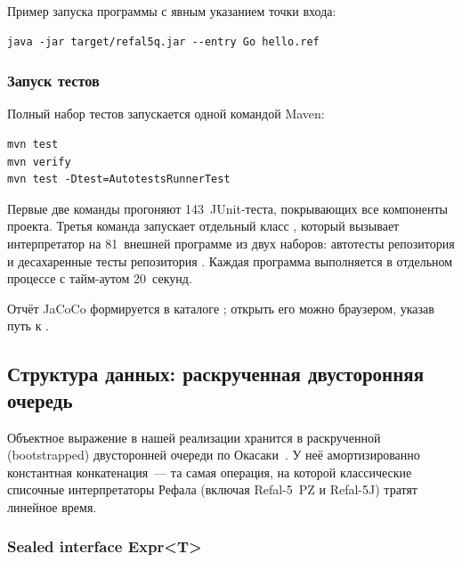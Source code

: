 Пример запуска программы  с явным указанием точки входа:

\begin{longlisting}
\caption{Пример запуска}\label{lst:run-example}
\begin{verbatim}
java -jar target/refal5q.jar --entry Go hello.ref
\end{verbatim}
\end{longlisting}

\subsubsection{Запуск тестов}

Полный набор тестов запускается одной командой Maven:

\newpage
\begin{longlisting}
\caption{Запуск тестов}\label{lst:test}
\begin{verbatim}
mvn test
mvn verify
mvn test -Dtest=AutotestsRunnerTest
\end{verbatim}
\end{longlisting}

Первые две команды прогоняют 143~JUnit-теста, покрывающих все компоненты
проекта. Третья команда запускает отдельный класс ,
который вызывает интерпретатор на 81~внешней программе из двух наборов:
автотесты репозитория  и десахаренные тесты репозитория
. Каждая программа выполняется в отдельном процессе
с тайм-аутом 20~секунд.

Отчёт JaCoCo формируется в каталоге ; открыть
его можно браузером, указав путь к .

\subsection{Структура данных: раскрученная двусторонняя очередь}
\label{subsec:deque-impl}

Объектное выражение в нашей реализации хранится в раскрученной (bootstrapped)
двусторонней очереди по Окасаки~\cite{okasaki_pfds}. У неё амортизированно
константная конкатенация~--- та самая операция, на которой классические
списочные интерпретаторы Рефала (включая Refal-5~PZ и Refal-5J) тратят
линейное время.

\subsubsection{Sealed interface Expr<T>}

